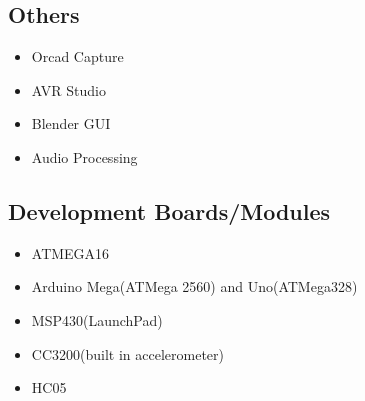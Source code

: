 \documentclass[11pt]{article}
\begin{document}
\begin{minipage}{1.5\linewidth}
\subsection{Others}
\begin{itemize}
\item Orcad Capture
\item AVR Studio
\item Blender GUI
\item Audio Processing
\end{itemize}
\end{minipage}

\begin{minipage}{1.5\linewidth}
\subsection{Development Boards/Modules}
\begin{itemize}
\item ATMEGA16
\item Arduino Mega(ATMega 2560) and Uno(ATMega328)
\item MSP430(LaunchPad)
\item CC3200(built in accelerometer)
\item HC05
\end{itemize}


\end{minipage}
\end{document}
